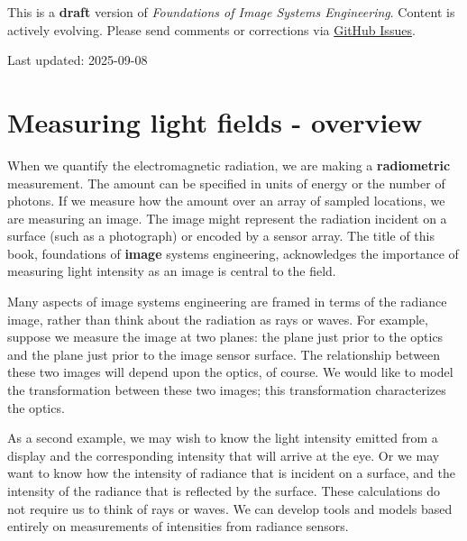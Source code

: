 \documentclass[
  letterpaper,
]{book}
\begin{document}
\begin{tcolorbox}[enhanced jigsaw, opacityback=0, breakable, coltitle=black, leftrule=.75mm, left=2mm, colframe=quarto-callout-warning-color-frame, opacitybacktitle=0.6, bottomtitle=1mm, bottomrule=.15mm, toprule=.15mm, title=\textcolor{quarto-callout-warning-color}{\faExclamationTriangle}\hspace{0.5em}{Work in Progress}, titlerule=0mm, toptitle=1mm, colback=white, rightrule=.15mm, colbacktitle=quarto-callout-warning-color!10!white, arc=.35mm]

This is a \textbf{draft} version of \emph{Foundations of Image Systems
Engineering}. Content is actively evolving. Please send comments or
corrections via \href{https://github.com/wandell/FISE-git/issues}{GitHub
Issues}.

Last updated: 2025-09-08

\end{tcolorbox}

\section{Measuring light fields -
overview}\label{sec-lfmeasurement-overview}

When we quantify the electromagnetic radiation, we are making a
\textbf{radiometric} measurement. The amount can be specified in units
of energy or the number of photons. If we measure how the amount over an
array of sampled locations, we are measuring an image. The image might
represent the radiation incident on a surface (such as a photograph) or
encoded by a sensor array. The title of this book, foundations of
\textbf{image} systems engineering, acknowledges the importance of
measuring light intensity as an image is central to the field.

Many aspects of image systems engineering are framed in terms of the
radiance image, rather than think about the radiation as rays or waves.
For example, suppose we measure the image at two planes: the plane just
prior to the optics and the plane just prior to the image sensor
surface. The relationship between these two images will depend upon the
optics, of course. We would like to model the transformation between
these two images; this transformation characterizes the optics.

As a second example, we may wish to know the light intensity emitted
from a display and the corresponding intensity that will arrive at the
eye. Or we may want to know how the intensity of radiance that is
incident on a surface, and the intensity of the radiance that is
reflected by the surface. These calculations do not require us to think
of rays or waves. We can develop tools and models based entirely on
measurements of intensities from radiance sensors.
\end{document}
